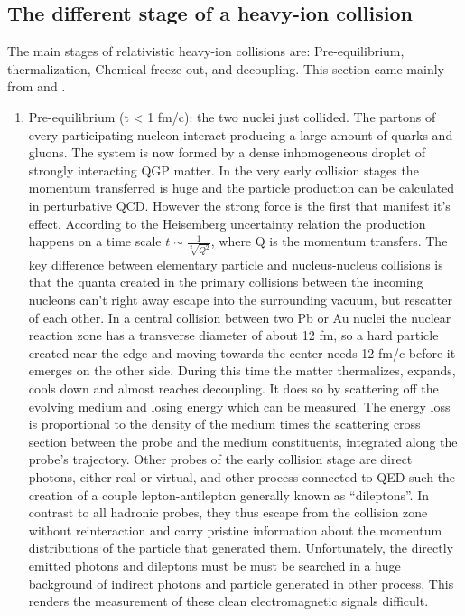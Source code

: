 \documentclass[12pt,a4paper]{book}
\begin{document}
	\subsection{The different stage of a heavy-ion collision}
	The main stages of relativistic heavy-ion collisions are: Pre-equilibrium, thermalization, Chemical freeze-out, and	decoupling. This section came mainly from \cite{heinz2004conceptsheavyionphysics} and \cite{amsdottorato9036}.
	\begin{enumerate}
		\item Pre-equilibrium (t < 1 fm/c): the two nuclei just collided. The partons of every
		participating nucleon interact producing a large amount of quarks and gluons. The system is now formed by a dense inhomogeneous droplet of strongly interacting QGP matter. In the very early collision stages the momentum transferred is huge and the particle production can be calculated in perturbative QCD. However the strong force is the first that manifest it's effect. According to the Heisemberg uncertainty relation the production happens on a time scale $t \sim \frac{1}{\sqrt[2]{Q^2}}$, where Q is the momentum transfers. The key difference between elementary particle and nucleus-nucleus collisions is that the quanta created in the primary collisions between the incoming nucleons can’t right away escape into the surrounding vacuum, but rescatter of each other. In a central collision between two Pb or Au nuclei the nuclear reaction zone has a transverse diameter of about 12 fm, so a hard particle created near the edge and moving towards the center needs 12 fm/c before it emerges on the other side. During this time the matter thermalizes, expands, cools down and almost reaches decoupling. It does so by scattering off the evolving medium and losing energy which can be measured. The energy loss is proportional to the density of the medium times the scattering cross section between the probe and the medium constituents, integrated along the probe’s trajectory. Other probes of the early collision stage are direct photons, either real or virtual, and other process connected to QED such the creation of a couple lepton-antilepton generally known as “dileptons”.  In contrast to all hadronic probes, they thus escape from the collision zone without reinteraction and carry pristine information about the momentum distributions of the particle that generated them. Unfortunately, the directly emitted photons and dileptons must be must be searched in a huge background of indirect photons and particle generated in other process, This renders the measurement of these clean electromagnetic signals difficult. %
		

\end{enumerate}
\end{document}
